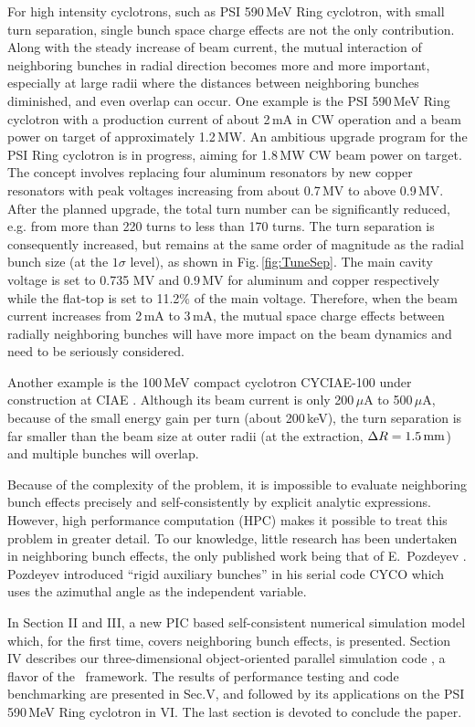 \documentclass[aps,prstab,twocolumn,superscriptaddress,showpacs]{revtex4}
\begin{document}
For high intensity cyclotrons, such as PSI 590\,MeV Ring cyclotron, with small turn separation, single bunch space charge effects are not the only contribution. 
Along with the steady increase of beam current, the mutual interaction of neighboring bunches in radial direction 
becomes more and more important, especially at large radii where the distances between neighboring bunches diminished, and even overlap can occur.
One example is the PSI 590\,MeV Ring cyclotron \cite{Mike:1} with a production current of about 2\,mA in CW operation and a beam power on target of approximately 1.2\,MW.
An ambitious upgrade program for the PSI Ring cyclotron is in progress, aiming for 1.8\,MW CW beam power on target. 
The concept involves replacing four aluminum resonators by new copper resonators with peak voltages
increasing from about 0.7\,MV to above 0.9\,MV. After the planned upgrade, the total turn number can be significantly reduced, e.g. from more than 220 turns to less than 
170 turns.
The turn separation is consequently increased, but remains at the same order of magnitude as the radial bunch size (at the $1\sigma$ level), as shown in Fig.\,\ref{fig:TuneSep}. The main cavity voltage is set to 0.735 MV and 0.9\,MV for aluminum and copper respectively while the flat-top is set to 11.2$\%$ of the main voltage.
Therefore, when the beam current increases from 2\,mA to 3\,mA, 
the mutual space charge effects between radially neighboring bunches will have more impact on the beam dynamics and need to be seriously considered.


Another example is the 100\,MeV compact cyclotron CYCIAE-100 under construction at CIAE \cite{Zhang:1}. Although its beam current is only 200\,$\mu$A to 500\,$\mu$A,
because of the small energy gain per turn (about 200\,keV), the turn separation is far smaller than the beam size at outer radii (at the extraction, $\Delta R = 1.5\RM{\,mm}$) and
multiple bunches will overlap.

Because of the complexity of the problem, it is impossible to evaluate neighboring bunch effects precisely and self-consistently by explicit 
analytic expressions. However, high performance computation (HPC) makes it possible to 
treat this problem in greater detail. To our knowledge, little research has been undertaken in neighboring bunch effects, the only published work being that of   
E.~Pozdeyev \cite{Poz:1}. Pozdeyev introduced ``rigid auxiliary bunches'' in his serial code CYCO which uses the azimuthal angle as the independent variable. 

In Section II and III, a new PIC based self-consistent numerical simulation model which, for the first time, covers neighboring bunch effects, is presented. 
Section IV describes our three-dimensional object-oriented parallel simulation code \opalcycl, a flavor of the \opal \  framework. 
The results of performance testing and code benchmarking are presented in Sec.V, and followed by its applications on the PSI 590\,MeV Ring cyclotron in VI. 
The last section is devoted to conclude the paper. 
\end{document}
